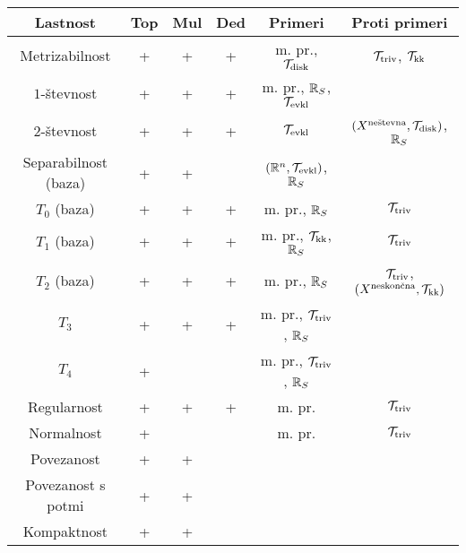 \begin{center}
    \begin{tabular}{ |c| c |c| c| c| c | }
    \hline
     Lastnost & Top & Mul & Ded & Primeri & Proti primeri\\ \hline
     Metrizabilnost & + & + & + & m. pr., $\mathcal{T}_{\text{disk}}$ & $\mathcal{T}_{\text{triv}}$, $\mathcal{T}_\text{kk}$ \\ \hline
     $1$-števnost & + & + & + & m. pr., $\mathbb{R}_S$, $\mathcal{T}_{\text{evkl}}$ &  \\ \hline
     $2$-števnost & + & + & + & $\mathcal{T}_{\text{evkl}}$ & $(X^\text{neštevna}, \mathcal{T}_{\text{disk}})$, $\mathbb{R}_S$ \\ \hline
     Separabilnost (baza) & + & + &  & $(\mathbb{R}^n, \mathcal{T}_{\text{evkl}})$, $\mathbb{R}_S$ & \\ \hline  
     $T_0$ (baza) & + & + & + & m. pr., $\mathbb{R}_S$ & $\mathcal{T}_{\text{triv}}$ \\ \hline
     $T_1$ (baza) & + & + & + & m. pr., $\mathcal{T}_{\text{kk}}$, $\mathbb{R}_S$ & $\mathcal{T}_{\text{triv}}$ \\ \hline
     $T_2$ (baza) & + & + & + & m. pr., $\mathbb{R}_S$ & $\mathcal{T}_{\text{triv}}$, $(X^\text{neskončna}, \mathcal{T}_{\text{kk}})$ \\ \hline
     $T_3$ & + & + & + & m. pr., $\mathcal{T}_{\text{triv}}$, $\mathbb{R}_S$ &   \\ \hline
     $T_4$ & + & &  & m. pr., $\mathcal{T}_{\text{triv}}$, $\mathbb{R}_S$ &  \\ \hline
     Regularnost & + & + & + & m. pr. & $\mathcal{T}_{\text{triv}}$ \\ \hline
     Normalnost & + & &  & m. pr. & $\mathcal{T}_{\text{triv}}$ \\ \hline
     Povezanost & + & + & & & \\ \hline
     Povezanost s potmi & + & + & & & \\ \hline
     Kompaktnost & + & + & & & \\ \hline
    \end{tabular}
\end{center}